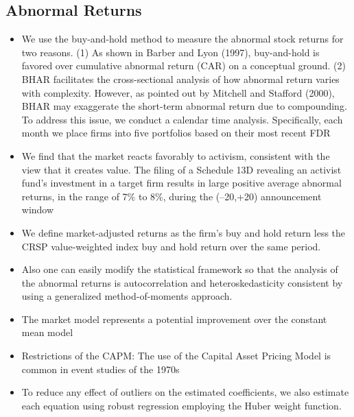 \documentclass[12pt]{article}
\begin{document}
\subsection{Abnormal Returns}

    \begin{itemize}

        \item We use the buy-and-hold method to measure the abnormal stock returns for two reasons. (1) As shown in Barber and Lyon (1997), buy-and-hold is favored over cumulative abnormal return (CAR) on a conceptual ground. (2) BHAR facilitates the cross-sectional analysis of how abnormal return varies with complexity. However, as pointed out by Mitchell and Stafford (2000), BHAR may exaggerate the short-term abnormal return due to compounding. To address this issue, we conduct a calendar time analysis. Specifically, each month we place firms into five portfolios based on their most recent FDR \citep{You2009}

        \item We find that the market reacts favorably to activism, consistent with the view that it creates value. The filing of a Schedule 13D revealing an activist fund’s investment in a target firm results in large positive average abnormal returns, in the range
        of 7\% to 8\%, during the (–20,+20) announcement window \citep{Brav2008}

        \item We define market-adjusted returns as the firm’s buy and hold return less the CRSP value-weighted index buy and hold return over the same period. \citep{Choi2012}

        \item Also one can easily modify the statistical framework so that the analysis of the abnormal returns is autocorrelation and heteroskedasticity consistent by using a generalized method-of-moments approach.\citep{MacKinlay1997}

        \item The market model represents a potential improvement over the constant mean model \citep{MacKinlay1997}

        \item Restrictions of the CAPM: The use of the Capital Asset Pricing Model is common in event studies of the 1970s \citep{MacKinlay1997} 

        \item To reduce any effect of outliers on the estimated coefficients, we also estimate each equation using robust regression employing the Huber weight function. \citep{Brigida2012}

    \end{itemize}
\end{document}
